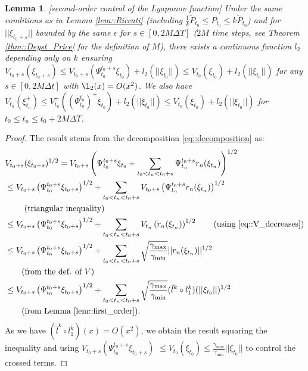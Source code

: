 \documentclass[a4paper,12pt,onecolumn]{article}
\newtheorem{lem}{Lemma}
\begin{document}
\begin{lem}\emph{[second-order control of the Lyapunov function]}
Under the same conditions as in Lemma \ref{lem::Riccati} (including $\frac{1}{k} \tilde{P}_{t_0} \leq P_{t_0} \leq k \tilde{P}_{t_0}$)  and for $||\xi_{t_0+s}||$ bounded by the same $\epsilon$ for $s \in [0, 2M \Delta T]$ ($2M$ time steps, see Theorem \ref{thm::Deyst_Price} for the definition of $M$), there exists a continuous function $l_2$ depending \emph{only} on $k$ ensuring $V_{t_0+s} \left( \xi_{t_0+s} \right) \leq V_{t_0+s} (\Psi_{t_0}^{t_0+s}\xi_{t_0}) + l_2( || \xi_{t_0} ||) \leq V_{t_0} (\xi_{t_0}) + l_2( || \xi_{t_0} ||) $ for any $s \in [0,2 M \Delta t] $ with $\l_2 (x) = O ( x^2)$. We also have $V_{t_n}\left( \xi_{t_n}^+ \right) \leq V_{t_n}^+ ( (\Psi_{t_0}^{t_n})^+ \xi_{t_0}) + l_2( || \xi_{t_0} ||) \leq V_{t_0} (\xi_{t_0}) + l_2( || \xi_{t_0} ||)$ for $t_0 \leq t_n \leq t_0 + 2M \Delta T$.
\label{lem::second_order}
\end{lem}
\begin{proof}
The result stems from the decomposition \eqref{eq::decomposition} as:
\begin{align*}
 & V_{t_0+s}  (\xi_{t_0+s})^{1/2} = V_{t_0+s} \left( \Psi_{t_0}^{t_0+s} \xi_{t_0} + \sum_{t_0<t_n<t_0+s} \Psi_{t_n}^{t_0+s} r_n(\xi_{t_n}) \right)^{1/2} \\
 & \leq V_{t_0+s} \left( \Psi_{t_0}^{t_0+s} \xi_{t_0+s} \right)^{1/2} + \sum_{t_0<t_n<t_0+s} V_{t_0+s} \left( \Psi_{t_n}^{t_0+s} r_n(\xi_{t_n}) \right)^{1/2} \\
& \tag*{ (triangular inequality)}\\
 & \leq V_{t_0+s}  \left( \Psi_{t_0}^{t_0+s} \xi_{t_0+s} \right)^{1/2} + \sum_{t_0<t_n<t_0+s} V_{t_n} \left( r_n(\xi_{t_n}) \right)^{1/2} \tag*{(using \eqref{eq::V_decreases})}\\
 & \leq V_{t_0+s}  \left( \Psi_{t_0}^{t_0+s} \xi_{t_0+s} \right)^{1/2} + \sum_{t_0<t_n<t_0+s} \sqrt{ \frac{\gamma_{\max}}{\gamma_{\min}} } || r_n(\xi_{t_n}) ||^{1/2} \\
 & \tag*{(from the def. of $V$)}\\
 & \leq V_{t_0+s}  \left( \Psi_{t_0}^{t_0+s} \xi_{t_0+s} \right)^{1/2} + \sum_{t_0<t_n<t_0+s} \sqrt{ \frac{\gamma_{\max}}{\gamma_{\min}} } ( \tilde{l}^k \circ l_1^k ) (||\xi_{t_0}||)^{1/2} \\
 & \tag*{(from Lemma \ref{lem::first_order}).}
\end{align*}
As we have $( \tilde{l}^k \circ l_1^k )(x) = O(x^2)$, we obtain the result squaring the inequality and using $V_{t_0+s}  \left( \Psi_{t_0}^{t_0+s} \xi_{t_0+s} \right)$ $ \leq V_{t_0}  \left( \xi_{t_0} \right) \leq \frac{\gamma_{\max}}{\gamma_{\min}} ||\xi_{t_0} ||$ to control the crossed terms.
\end{proof}
\end{document}
